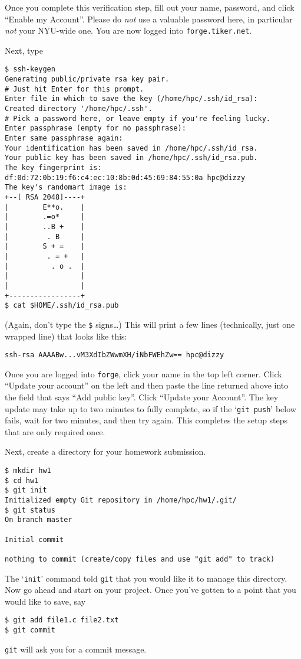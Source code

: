 \documentclass[11pt]{article}
\begin{document}
Once you complete this
verification step, fill out your name, password, and click ``Enable my
Account''. Please do \emph{not} use a valuable password here, in
particular \emph{not} your NYU-wide one. You are now logged into
\texttt{forge.tiker.net}.

Next, type
\begin{lstlisting}
$ ssh-keygen
Generating public/private rsa key pair.
# Just hit Enter for this prompt.
Enter file in which to save the key (/home/hpc/.ssh/id_rsa): 
Created directory '/home/hpc/.ssh'.
# Pick a password here, or leave empty if you're feeling lucky.
Enter passphrase (empty for no passphrase): 
Enter same passphrase again: 
Your identification has been saved in /home/hpc/.ssh/id_rsa.
Your public key has been saved in /home/hpc/.ssh/id_rsa.pub.
The key fingerprint is:
df:0d:72:0b:19:f6:c4:ec:10:8b:0d:45:69:84:55:0a hpc@dizzy
The key's randomart image is:
+--[ RSA 2048]----+
|        E**o.    |
|        .=o*     |
|        ..B +    |
|         . B     |
|        S + =    |
|         . = +   |
|          . o .  |
|                 |
|                 |
+-----------------+
$ cat $HOME/.ssh/id_rsa.pub
\end{lstlisting}
(Again, don't type the \verb|$| signs\dots)
This will print a few lines (technically, just one wrapped line) that
looks like this:
\begin{lstlisting}
ssh-rsa AAAABw...vM3XdIbZWwmXH/iNbFWEhZw== hpc@dizzy
\end{lstlisting}
Once you are logged into \texttt{forge}, click your name in the top
left corner. Click ``Update your account'' on the left and then paste
the line returned above into the field that says ``Add public key''.
Click ``Update your Account''. The key update may take up to two
minutes to fully complete, so if the `\texttt{git push}' below fails,
wait for two minutes, and then try again.
This completes the setup steps that are only required once.

Next, create a directory for your homework submission.
\begin{lstlisting}
$ mkdir hw1
$ cd hw1
$ git init
Initialized empty Git repository in /home/hpc/hw1/.git/
$ git status
On branch master

Initial commit

nothing to commit (create/copy files and use "git add" to track)
\end{lstlisting}
The `\texttt{init}' command told \texttt{git} that you would like it to
manage this directory. Now go ahead and start on your project.
Once you've gotten to a point that you would like to save, say
\begin{lstlisting}
$ git add file1.c file2.txt
$ git commit
\end{lstlisting}
\texttt{git} will ask you for a commit message.
\end{document}
